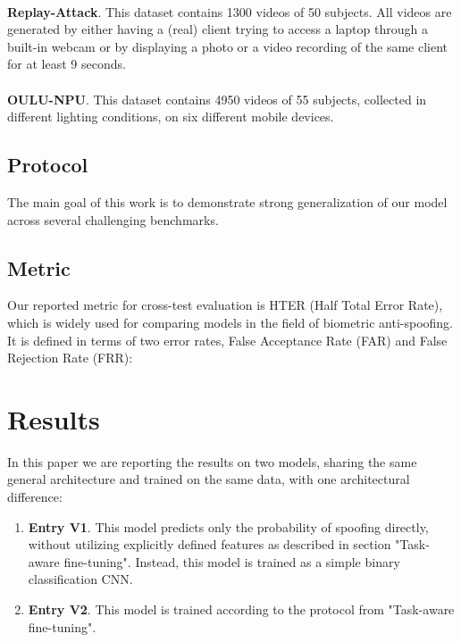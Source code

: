 \documentclass[10pt,twocolumn,letterpaper]{article}
\begin{document}
\paragraph{} \textbf{Replay-Attack}. This dataset contains 1300 videos of 50 subjects. All videos are generated by either having a (real) client trying to access a laptop through a built-in webcam or by displaying a photo or a video recording of the same client for at least 9 seconds.

\paragraph{} \textbf{OULU-NPU}. This dataset contains 4950 videos of 55 subjects, collected in different lighting conditions, on six different mobile devices.

\subsection{Protocol}

The main goal of this work is to demonstrate strong generalization of our model across several challenging benchmarks. 

\subsection{Metric}

Our reported metric for cross-test evaluation is HTER (Half Total Error Rate)\cite{HTER}, which is widely used for comparing models in the field of biometric anti-spoofing. It is defined in terms of two error rates, False Acceptance Rate (FAR) and False Rejection Rate (FRR):



\section{Results}



In this paper we are reporting the results on two models, sharing the same general architecture and trained on the same data, with one architectural difference:

\begin{enumerate}
    \item \textbf{Entry V1}. This model predicts only the probability of spoofing directly, without utilizing explicitly defined features as described in section "Task-aware fine-tuning". Instead, this model is trained as a simple binary classification CNN.
    \item \textbf{Entry V2}. This model is trained according to the protocol from "Task-aware fine-tuning".
\end{enumerate}
\end{document}
